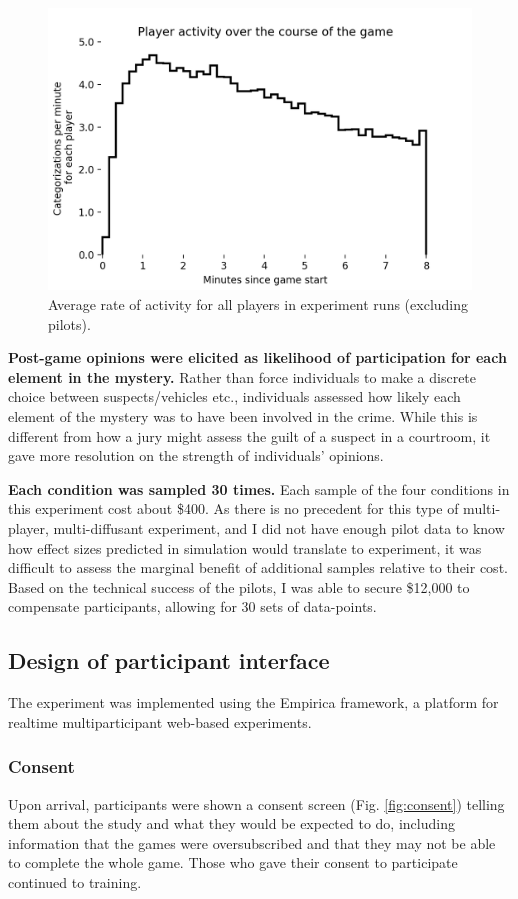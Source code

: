 \documentclass{article}
\begin{document}
\begin{figure}[h!]
\centering
\includegraphics[width=.5\columnwidth]{player_activity.png}
\caption{Average rate of activity for all players in experiment runs (excluding pilots).}
\label{fig:player_activity}
\end{figure}

\textbf{Post-game opinions were elicited as likelihood of participation for each element in the mystery.}
Rather than force individuals to make a discrete choice between suspects/vehicles etc., individuals assessed how likely each element of the mystery was to have been involved in the crime. While this is different from how a jury might assess the guilt of a suspect in a courtroom, it gave more resolution on the strength of individuals' opinions. 

\textbf{Each condition was sampled 30 times.}
Each sample of the four conditions in this experiment cost about \$400. As there is no precedent for this type of multi-player, multi-diffusant experiment, and I did not have enough pilot data to know how effect sizes predicted in simulation would translate to experiment, it was difficult to assess the marginal benefit of additional samples relative to their cost. Based on the technical success of the pilots, I was able to secure \$12,000 to compensate participants, allowing for 30 sets of data-points.

\subsection{Design of participant interface}
\label{interface}
The experiment was implemented using the Empirica \cite{almaatouq2021empirica} framework, a platform for realtime multiparticipant web-based experiments.

\subsubsection{Consent}
Upon arrival, participants were shown a consent screen (Fig. \ref{fig:consent}) telling them about the study and what they would be expected to do, including information that the games were oversubscribed and that they may not be able to complete the whole game. Those who gave their consent to participate continued to training.
\end{document}
